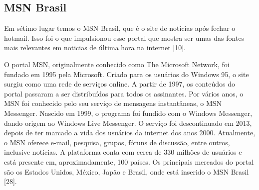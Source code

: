 \documentclass[a4paper]{article}
\begin{document}
\begin{titlepage}
\subsection{MSN Brasil}

Em sétimo lugar temos o MSN Brasil, que é o site de noticias após fechar o hotmail. Isso foi o que impulsionou esse portal que mostra ser umas das fontes mais relevantes em noticias de última hora na internet [10].

O portal MSN, originalmente conhecido como The Microsoft Network, foi fundado em 1995 pela Microsoft. Criado para os usuários do Windows 95, o site surgiu como uma rede de serviços online. A partir de 1997, os conteúdos do portal passaram a ser distribuídos para todos os assinantes. Por vários anos, o MSN foi conhecido pelo seu serviço de mensagens instantâneas, o MSN Messenger. Nascido em 1999, o programa foi fundido com o Windows Messenger, dando origem ao Windows Live Messenger. O serviço foi descontinuado em 2013, depois de ter marcado a vida dos usuários da internet dos anos 2000. Atualmente, o MSN oferece e-mail, pesquisa, grupos, fóruns de discussão, entre outros, inclusive notícias. A plataforma conta com cerca de 330 milhões de usuários e está presente em, aproximadamente, 100 países. Os principais mercados do portal são os Estados Unidos, México, Japão e  Brasil, onde está inserido o MSN Brasil [28].


\end{titlepage}
\end{document}
